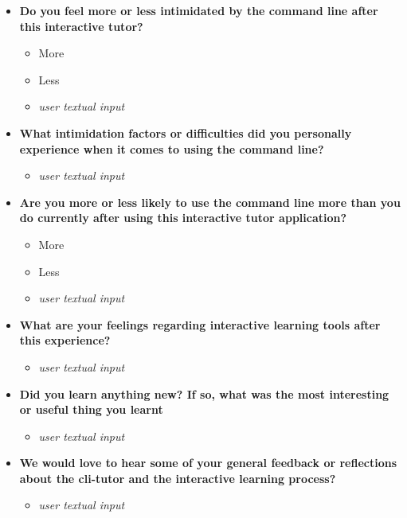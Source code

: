 \begin{itemize}

	\item  \textbf{Do you feel more or less intimidated by the command line after this interactive tutor?}
	      \begin{itemize}
		      \item More
		      \item Less
		      \item \textit{user textual input}
	      \end{itemize}

	\item  \textbf{What intimidation factors or difficulties did you personally experience when it comes to using the command line?}
	      \begin{itemize}
		      \item \textit{user textual input}
	      \end{itemize}

	\item  \textbf{Are you more or less likely to use the command line more than you do currently after using this interactive tutor application?}
	      \begin{itemize}
		      \item More
		      \item Less
		      \item \textit{user textual input}
	      \end{itemize}

	\item  \textbf{What are your feelings regarding interactive learning tools after this experience?}
	      \begin{itemize}
		      \item \textit{user textual input}
	      \end{itemize}

	\item  \textbf{Did you learn anything new? If so, what was the most interesting or useful thing you learnt}
	      \begin{itemize}
		      \item \textit{user textual input}
	      \end{itemize}
	\item  \textbf{We would love to hear some of your general feedback or reflections about the cli-tutor and the interactive learning process?}
	      \begin{itemize}
		      \item \textit{user textual input}
	      \end{itemize}
\end{itemize}
